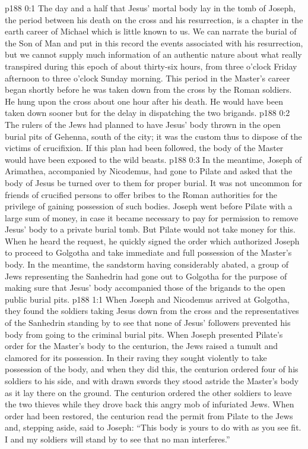 \author{Midwayer Commission}
\vs p188 0:1 The day and a half that Jesus’ mortal body lay in the tomb of Joseph, the period between his death on the cross and his resurrection, is a chapter in the earth career of Michael which is little known to us. We can narrate the burial of the Son of Man and put in this record the events associated with his resurrection, but we cannot supply much information of an authentic nature about what really transpired during this epoch of about thirty\hyp{}six hours, from three o’clock Friday afternoon to three o’clock Sunday morning. This period in the Master’s career began shortly before he was taken down from the cross by the Roman soldiers. He hung upon the cross about one hour after his death. He would have been taken down sooner but for the delay in dispatching the two brigands.
\vs p188 0:2 The rulers of the Jews had planned to have Jesus’ body thrown in the open burial pits of Gehenna, south of the city; it was the custom thus to dispose of the victims of crucifixion. If this plan had been followed, the body of the Master would have been exposed to the wild beasts.
\vs p188 0:3 In the meantime, Joseph of Arimathea, accompanied by Nicodemus, had gone to Pilate and asked that the body of Jesus be turned over to them for proper burial. It was not uncommon for friends of crucified persons to offer bribes to the Roman authorities for the privilege of gaining possession of such bodies. Joseph went before Pilate with a large sum of money, in case it became necessary to pay for permission to remove Jesus’ body to a private burial tomb. But Pilate would not take money for this. When he heard the request, he quickly signed the order which authorized Joseph to proceed to Golgotha and take immediate and full possession of the Master’s body. In the meantime, the sandstorm having considerably abated, a group of Jews representing the Sanhedrin had gone out to Golgotha for the purpose of making sure that Jesus’ body accompanied those of the brigands to the open public burial pits.
\vs p188 1:1 When Joseph and Nicodemus arrived at Golgotha, they found the soldiers taking Jesus down from the cross and the representatives of the Sanhedrin standing by to see that none of Jesus’ followers prevented his body from going to the criminal burial pits. When Joseph presented Pilate’s order for the Master’s body to the centurion, the Jews raised a tumult and clamored for its possession. In their raving they sought violently to take possession of the body, and when they did this, the centurion ordered four of his soldiers to his side, and with drawn swords they stood astride the Master’s body as it lay there on the ground. The centurion ordered the other soldiers to leave the two thieves while they drove back this angry mob of infuriated Jews. When order had been restored, the centurion read the permit from Pilate to the Jews and, stepping aside, said to Joseph: “This body is yours to do with as you see fit. I and my soldiers will stand by to see that no man interferes.”
